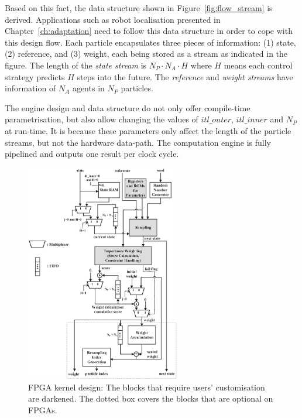 Based on this fact, the data structure shown in Figure~\ref{fig:flow_stream} is derived.
Applications such as robot localisation presented in Chapter~\ref{ch:adaptation} need to follow this data structure in order to cope with this design flow.
Each particle encapsulates three pieces of information: (1) state, (2) reference, and (3) weight, each being stored as a stream as indicated in the figure.
The length of the \textit{state stream} is $N_P \cdot N_A \cdot H$ where $H$ means each control strategy predicts $H$ steps into the future.
The \textit{reference} and \textit{weight streams} have information of $N_A$ agents in $N_P$ particles.

The engine design and data structure do not only offer compile-time parametrisation, but also allow changing the values of $itl\_outer$, $itl\_inner$ and $N_P$ at run-time.
It is because these parameters only affect the length of the particle streams, but not the hardware data-path.
The computation engine is fully pipelined and outputs one result per clock cycle.

\begin{figure}[t!]
\begin{center}
\includegraphics[width=0.6\textwidth]{5_tool/figures/kernel}
\end{center}
\caption{FPGA kernel design: The blocks that require users' customisation are darkened. The dotted box covers the blocks that are optional on FPGAs.}
\label{fig:flow_kernel}
\end{figure}

